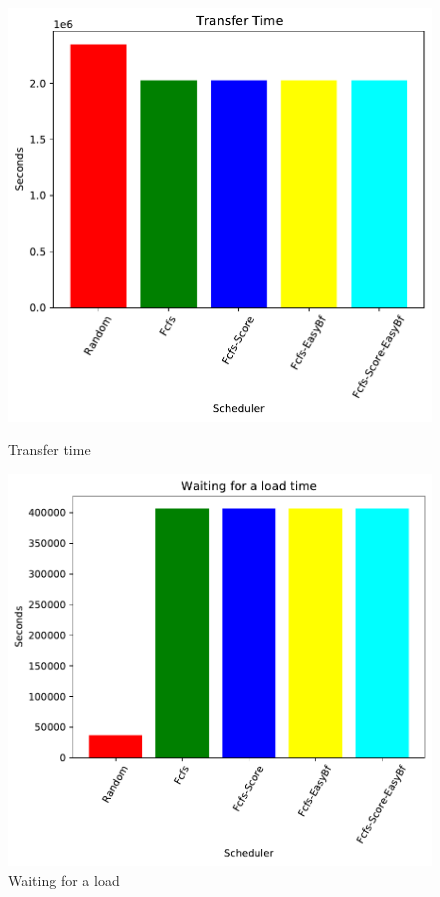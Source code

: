 \documentclass[a4paper]{article}
\begin{document}
	\begin{figure}[H] 
	\begin{minipage}[b]{0.5\linewidth}\centering\includegraphics[width=1.11\linewidth]{MBSS/plot/2021-05-23_Transfer_time.pdf}\caption{Transfer time}\vspace{4ex}\end{minipage}
	\begin{minipage}[b]{0.5\linewidth}\centering\includegraphics[width=1.11\linewidth]{MBSS/plot/2021-05-23_Waiting_for_a_load_time.pdf}\caption{Waiting for a load}\vspace{4ex}\end{minipage} 

\end{figure}
\end{document}
